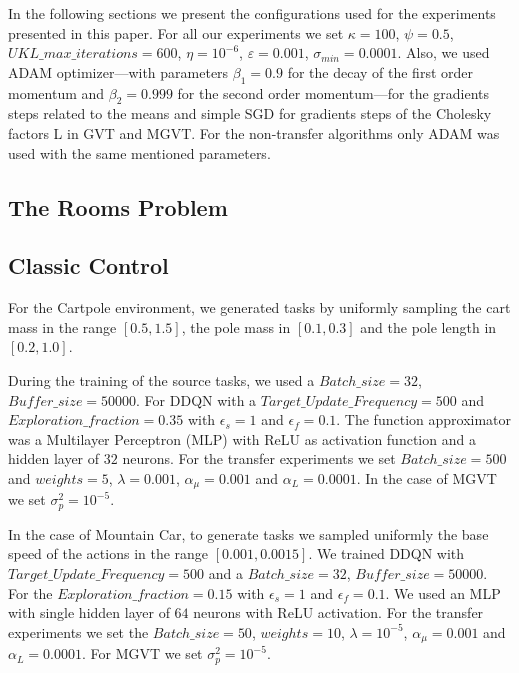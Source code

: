 \documentclass{article}
\begin{document}
In the following sections we present the configurations used for the experiments presented in this paper. For all our experiments we set $\kappa=100$, $\psi=0.5$, $UKL\_max\_iterations=600$, $\eta=10^{-6}$, $\varepsilon=0.001$, $\sigma_{min}=0.0001$. Also, we used ADAM optimizer---with parameters $\beta_1=0.9$ for the decay of the first order momentum and $\beta_2=0.999$ for the second order momentum---for the gradients steps related to the means and simple SGD for gradients steps of the Cholesky factors L in GVT and MGVT. For the non-transfer algorithms only ADAM was used with the same mentioned parameters.

\subsection{The Rooms Problem}

\subsection{Classic Control}

For the Cartpole environment, we generated tasks by uniformly sampling the cart mass in the range $\left[0.5,1.5\right]$, the pole mass in $\left[0.1,0.3\right]$ and the pole length in $\left[0.2,1.0\right]$. 

During the training of the source tasks, we used a $Batch\_size = 32$, $Buffer\_size = 50000$. For DDQN with a $Target\_Update\_Frequency = 500$ and $Exploration\_fraction = 0.35$ with $\epsilon_s=1$ and $\epsilon_f=0.1$. The function approximator was a Multilayer Perceptron (MLP) with ReLU as activation function and a hidden layer of $32$ neurons. For the transfer experiments we set $Batch\_size=500$ and $weights=5$, $\lambda=0.001$, $\alpha_{\mu}=0.001$ and $\alpha_L=0.0001$. In the case of MGVT we set $\sigma_p^2=10^{-5}$.

In the case of Mountain Car, to generate tasks we sampled uniformly the base speed of the actions in the range $\left[0.001, 0.0015\right]$. We trained DDQN with $Target\_Update\_Frequency = 500$ and a $Batch\_size = 32$, $Buffer\_size = 50000$. For the $Exploration\_fraction = 0.15$ with $\epsilon_s=1$ and $\epsilon_f=0.1$. We used an MLP with single hidden layer of $64$ neurons with ReLU activation. For the transfer experiments we set the $Batch\_size=50$, $weights=10$, $\lambda=10^{-5}$, $\alpha_{\mu}=0.001$ and $\alpha_L=0.0001$. For MGVT we set $\sigma_p^2=10^{-5}$.

\end{document}
